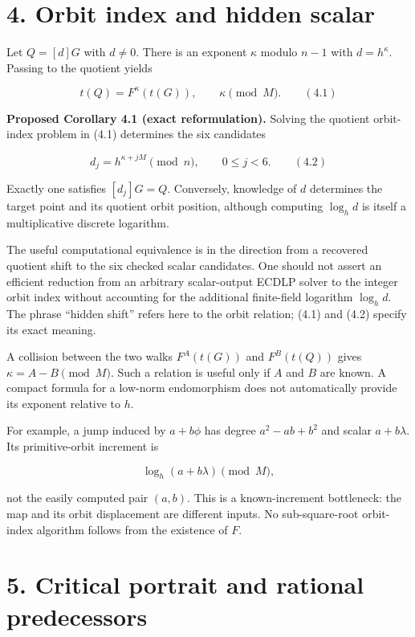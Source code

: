 \documentclass[
  11pt,
  a4paper,
]{article}
\begin{document}
\section{4. Orbit index and hidden
scalar}\label{orbit-index-and-hidden-scalar}

Let \(Q=[d]G\) with \(d\neq0\). There is an exponent \(\kappa\) modulo
\(n-1\) with \(d=h^\kappa\). Passing to the quotient yields

\[
t(Q)=F^\kappa(t(G)),\qquad \kappa\pmod M. \qquad (4.1)
\]

\textbf{Proposed Corollary 4.1 (exact reformulation).} Solving the
quotient orbit-index problem in (4.1) determines the six candidates

\[
d_j=h^{\kappa+jM}\pmod n,\qquad 0\leq j<6. \qquad (4.2)
\]

Exactly one satisfies \([d_j]G=Q\). Conversely, knowledge of \(d\)
determines the target point and its quotient orbit position, although
computing \(\log_h d\) is itself a multiplicative discrete logarithm.

The useful computational equivalence is in the direction from a
recovered quotient shift to the six checked scalar candidates. One
should not assert an efficient reduction from an arbitrary scalar-output
ECDLP solver to the integer orbit index without accounting for the
additional finite-field logarithm \(\log_h d\). The phrase ``hidden
shift'' refers here to the orbit relation; (4.1) and (4.2) specify its
exact meaning.

A collision between the two walks \(F^A(t(G))\) and \(F^B(t(Q))\) gives
\(\kappa=A-B\pmod M\). Such a relation is useful only if \(A\) and \(B\)
are known. A compact formula for a low-norm endomorphism does not
automatically provide its exponent relative to \(h\).

For example, a jump induced by \(a+b\phi\) has degree \(a^2-ab+b^2\) and
scalar \(a+b\lambda\). Its primitive-orbit increment is

\[
\log_h(a+b\lambda)\pmod M,
\]

not the easily computed pair \((a,b)\). This is a known-increment
bottleneck: the map and its orbit displacement are different inputs. No
sub-square-root orbit-index algorithm follows from the existence of
\(F\).

\section{5. Critical portrait and rational
predecessors}\label{critical-portrait-and-rational-predecessors}
\end{document}
